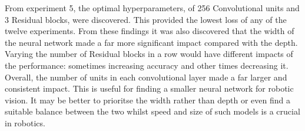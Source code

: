 \documentclass[11pt]{article}
\def\BESTWIDTH{256 }
\def\BESTDEPTH{3 }
\begin{document}
From experiment 5, the optimal hyperparameters, of \BESTWIDTH Convolutional units and \BESTDEPTH Residual blocks, were discovered. This provided the lowest loss of any of the twelve experiments. From these findings it was also discovered that the width of the neural network made a far more significant impact compared with the depth. Varying the number of Residual blocks in a row would have different impacts of the performance: sometimes increasing accuracy and other times decreasing it. Overall, the number of units in each convolutional layer made a far larger and consistent impact. This is useful for finding a smaller neural network for robotic vision. It may be better to prioritse the width rather than depth or even find a suitable balance between the two whilst speed and size of such models is a crucial in robotics.
\end{document}
